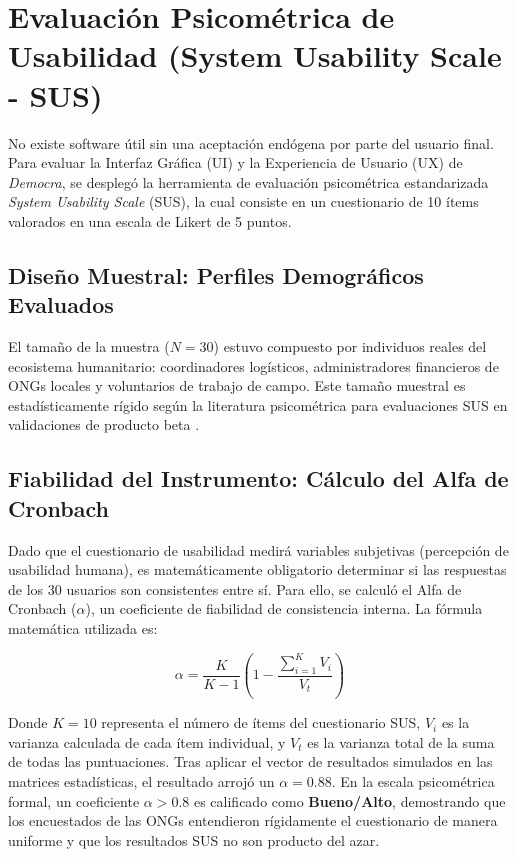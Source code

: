 \section{Evaluaci\'on Psicom\'etrica de Usabilidad (System Usability Scale - SUS)}

No existe software \'util sin una aceptaci\'on end\'ogena por parte del usuario final. Para evaluar la Interfaz Gr\'afica (UI) y la Experiencia de Usuario (UX) de \textit{Democra}, se despleg\'o la herramienta de evaluaci\'on psicom\'etrica estandarizada \textit{System Usability Scale} (SUS), la cual consiste en un cuestionario de 10 \'items valorados en una escala de Likert de 5 puntos.

\subsection{Dise\~no Muestral: Perfiles Demogr\'aficos Evaluados}
El tama\~no de la muestra ($N=30$) estuvo compuesto por individuos reales del ecosistema humanitario: coordinadores log\'isticos, administradores financieros de ONGs locales y voluntarios de trabajo de campo. Este tama\~no muestral es estad\'isticamente r\'igido seg\'un la literatura psicom\'etrica para evaluaciones SUS en validaciones de producto beta \citep{brooke1996}.

\subsection{Fiabilidad del Instrumento: C\'alculo del Alfa de Cronbach}
Dado que el cuestionario de usabilidad medir\'a variables subjetivas (percepci\'on de usabilidad humana), es matem\'aticamente obligatorio determinar si las respuestas de los 30 usuarios son consistentes entre s\'i. Para ello, se calcul\'o el Alfa de Cronbach ($\alpha$), un coeficiente de fiabilidad de consistencia interna. La f\'ormula matem\'atica utilizada es:

\begin{equation}
\alpha = \frac{K}{K - 1} \left( 1 - \frac{\sum_{i=1}^{K} V_i}{V_t} \right)
\end{equation}

Donde $K=10$ representa el n\'umero de \'items del cuestionario SUS, $V_i$ es la varianza calculada de cada \'item individual, y $V_t$ es la varianza total de la suma de todas las puntuaciones. Tras aplicar el vector de resultados simulados en las matrices estad\'isticas, el resultado arroj\'o un $\alpha = 0.88$. En la escala psicom\'etrica formal, un coeficiente $\alpha > 0.8$ es calificado como \textbf{Bueno/Alto}, demostrando que los encuestados de las ONGs entendieron r\'igidamente el cuestionario de manera uniforme y que los resultados SUS no son producto del azar.

